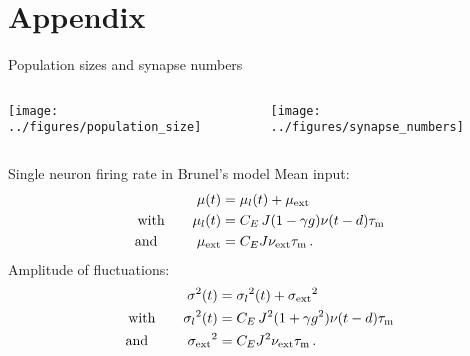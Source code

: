 \documentclass[xcolor=x11names,compress]{beamer}
\renewcommand{\(}{\begin{columns}}
\renewcommand{\)}{\end{columns}}
\newcommand{\<}[1]{\begin{column}{#1}}
\renewcommand{\>}{\end{column}}
\begin{document}
\section{Appendix}
\label{sec:appendix}

\begin{frame}[t]{Population sizes and synapse numbers}
    \begin{columns}[T] %
    \begin{column}[T]{3cm} %
        \texttt{[image: ../figures/population\_size]}
    \end{column}
    \begin{column}[T]{6cm} %
        \texttt{[image: ../figures/synapse\_numbers]}
    \end{column}
    \end{columns}
\end{frame}
    

\begin{frame}[t]{Single neuron firing rate in Brunel's model}
    Mean input:
\begin{equation*}
    \begin{split}
        \mu(t)          &= \mu_l(t) + \mu_\text{ext} \\
        \text{with} \qquad \mu_l(t)        &= C_E \, J (1 - \gamma g) \nu(t - d) \tau_\text{m} \\
        \text{and~~\,} \qquad \mu_\text{ext}  &= C_E J \nu_\text{ext} \tau_\text{m} \,.
    \end{split}
\end{equation*}
\vfill
    Amplitude of fluctuations:
\begin{equation*}
    \begin{split}
        \sigma^2(t)     &= {\sigma_l}^2(t) + {\sigma_\text{ext}}^2 \\
        \text{with} \qquad      {\sigma_l}^2(t)       
                        &= C_E \, J^2 (1 + \gamma g^2) \nu(t - d) \tau_\text{m} \\
            \text{and~~\,}  \qquad    
        {\sigma_\text{ext}}^2  &= C_E J^2 \nu_\text{ext} \tau_\text{m} \,.
    \end{split}
\end{equation*}
\end{frame}
\end{document}
